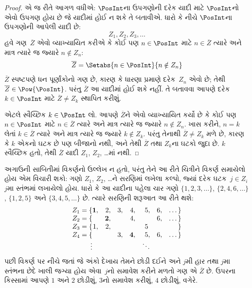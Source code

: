 \begin{proof}
એ જ રીતે આગળ વધીએ: $\PosInt$ના ઉપગણોની દરેક યાદી માટે
$\PosInt$નો એવો ઉપગણ હોય છે જે યાદીમાં હોઈ ન શકે તે બતાવીએ.
ધારો કે નીચે $\PosInt$ના ઉપગણોની આપેલી યાદી છે:
\[
Z_{1}, Z_{2}, Z_{3}, \dots
\]
હવે ગણ~$\overline{Z}$ એવો વ્યાખ્યાયિત કરીએ કે કોઈ પણ
$n \in \PosInt$ માટે $n \in \overline{Z}$ ત્યારે અને માત્ર
ત્યારે જ જ્યારે $n \notin Z_{n}$:
\[
\overline{Z} = \Setabs{n \in \PosInt}{n \notin Z_n}
\]
$\overline{Z}$ સ્પષ્ટપણે ધન પૂર્ણાંકોનો ગણ છે, કારણ કે ધારણા
પ્રમાણે દરેક~$Z_n$ એવો છે; તેથી $\overline{Z} \in
\Pow{\PosInt}$. પરંતુ $\overline{Z}$ આ યાદીમાં હોઈ શકે નહીં.
તે બતાવવા આપણે દરેક $k \in \PosInt$ માટે $\overline{Z} \neq
Z_k$ સ્થાપિત કરીશું.

એટલે સ્વૈચ્છિક $k \in \PosInt$ લો. આપણે $\overline{Z}$ને એવો
વ્યાખ્યાયિત કર્યો છે કે કોઈ પણ $n \in \PosInt$ માટે
$n \in \overline{Z}$ ત્યારે અને માત્ર ત્યારે જ જ્યારે
$n \notin Z_n$. ખાસ કરીને, $n=k$ લેતાં
$k \in \overline{Z}$ ત્યારે અને માત્ર ત્યારે જ જ્યારે
$k \notin Z_k$. પરંતુ તેનાથી $\overline{Z} \neq Z_k$ મળે છે,
કારણ કે $k$ એકનો ઘટક છે પણ બીજાનો નથી, અને તેથી
$\overline{Z}$ તથા $Z_k$ના ઘટકો જુદા છે. $k$ સ્વૈચ્છિક
હતો, તેથી $\overline{Z}$ યાદી $Z_1$, $Z_2$, \dots{}માં નથી.
\end{proof}

\begin{explain}
અગાઉની સાબિતીમાં વિકર્ણનો ઉલ્લેખ ન હતો, પરંતુ તેને આ રીતે
ચિત્રીને વિકર્ણ સમાયેલો હોય એમ વિચારી શકો: ગણો $Z_1$, $Z_2$,
\dots{}ને સરણિમાં લખેલા કલ્પો, જ્યાં દરેક ઘટક~$j \in Z_i$
$j$મા સ્તંભમાં લખાયેલો હોય. ધારો કે આ યાદીના પહેલા ચાર ગણો
$\{1,2,3,\dots\}$, $\{2, 4, 6, \dots\}$, $\{1,2,5\}$ અને
$\{3,4,5,\dots\}$ છે. ત્યારે સરણિની શરૂઆત આ રીતે થશે:
\[
\begin{array}{r@{}rrrrrrr}
  Z_1 = \{ & \mathbf{1}, & 2, & 3, & 4, & 5, & 6, & \dots\}\\
  Z_2 = \{ &  & \mathbf{2}, &  & 4, &  & 6, & \dots\}\\
  Z_3 = \{ & 1, & 2, &  &  & 5\phantom{,} &  & \}\\
  Z_4 = \{ &  &  & 3, & \mathbf{4}, & 5, & 6, & \dots\}\\
  \vdots & & & & & \ddots
\end{array}
\]
પછી વિકર્ણ પર નીચે જતાં જે અંકો દેખાય તેમને છોડી દઈને અને
$j$મી હાર તથા $j$મા સ્તંભના છેદે ખાલી જગ્યા હોય એવા~$j$નો
સમાવેશ કરીને મળતો ગણ એ $\overline{Z}$ છે. ઉપરના કિસ્સામાં આપણે
$1$ અને $2$ છોડીશું, $3$નો સમાવેશ કરીશું, $4$ છોડીશું, વગેરે.
\end{explain}

